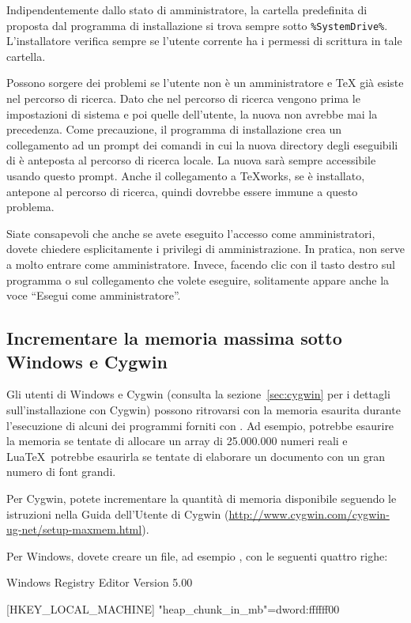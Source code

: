 \documentclass{article}
\begin{document}
Indipendentemente dallo stato di amministratore, la cartella predefinita
di \TL{} proposta dal programma di installazione si trova sempre sotto
\verb|%SystemDrive%|. L'installatore verifica sempre se l'utente corrente
ha i permessi di scrittura in tale cartella.

Possono sorgere dei problemi se l'utente non è un amministratore e \TeX{}
già esiste nel percorso di ricerca. Dato che nel percorso di ricerca
vengono prima le impostazioni di sistema e poi quelle dell'utente, la
nuova \TL{} non avrebbe mai la precedenza. Come precauzione, il programma
di installazione crea un collegamento ad un prompt dei comandi in cui la
nuova directory degli eseguibili di \TL{} è anteposta al percorso di
ricerca locale. La nuova \TL{} sarà sempre accessibile usando questo
prompt. Anche il collegamento a \TeX{}works, se è installato, antepone
\TL{} al percorso di ricerca, quindi dovrebbe essere immune a questo
problema.

Siate consapevoli che anche se avete eseguito l'accesso come amministratori,
dovete chiedere esplicitamente i privilegi di amministrazione. In pratica, non
serve a molto entrare come amministratore. Invece, facendo clic con il tasto
destro sul programma o sul collegamento che volete eseguire, solitamente appare
anche la voce ``Esegui come amministratore''.


\subsection{Incrementare la memoria massima sotto Windows e Cygwin}
\label{sec:cygwin-maxmem}

Gli utenti di Windows e Cygwin (consulta la sezione~\ref{sec:cygwin} per i
dettagli sull'installazione con Cygwin) possono ritrovarsi con la memoria
esaurita durante l'esecuzione di alcuni dei programmi forniti con \TL. Ad
esempio,  potrebbe esaurire la memoria se tentate di allocare un
array di 25.000.000 numeri reali e Lua\TeX\ potrebbe esaurirla se tentate di
elaborare un documento con un gran numero di font grandi.

Per Cygwin, potete incrementare la quantità di memoria disponibile seguendo
le istruzioni nella Guida dell'Utente di Cygwin
(\url{http://www.cygwin.com/cygwin-ug-net/setup-maxmem.html}).

Per Windows, dovete creare un file, ad esempio , con le
seguenti quattro righe:

\begin{sverbatim}
Windows Registry Editor Version 5.00

[HKEY_LOCAL_MACHINE\Software\Cygwin]
"heap_chunk_in_mb"=dword:ffffff00
\end{sverbatim}
\end{document}
